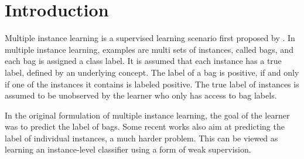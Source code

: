 




\section{Introduction}
Multiple instance learning is a supervised learning scenario first proposed by \citet{dietterich1997solving}.
In multiple instance learning, examples are multi sets of instances, called bags, and each bag is assigned a class label.
It is assumed that each instance has a true label, defined by an underlying concept. The label of a bag is positive, if and only if one of
the instances it contains is labeled positive. The true label of instances is assumed to be unobserved by the learner who only has access to bag labels.

In the original formulation of multiple instance learning, the goal of the learner
was to predict the label of bags. Some recent works also aim at predicting
the label of individual instances, a much harder problem.
This can be viewed as learning an instance-level classifier using a form of weak supervision.

